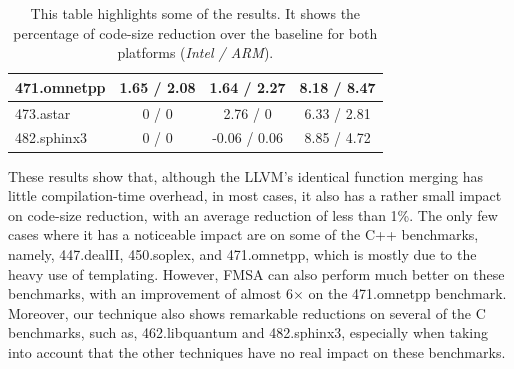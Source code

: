 \begin{table}[]
{\begin{tabular}{|l|c|c|c|}
471.omnetpp                               & 1.65 / 2.08        & 1.64 / 2.27   & 8.18 / 8.47             \\ \hline
473.astar                                 & 0 / 0              & 2.76 / 0      & 6.33 / 2.81             \\ \hline
482.sphinx3                               & 0 / 0              & -0.06 / 0.06  & 8.85 / 4.72             \\ \hline
\end{tabular}
}
\caption{This table highlights some of the results.
         It shows the percentage of code-size reduction over the baseline
         for both platforms (\textit{Intel / ARM}). }
\end{table}


These results show that, although the LLVM's identical function merging has 
little compilation-time overhead, in most cases, it also has a rather small
impact on code-size reduction, with an average reduction of less than 1\%.
The only few cases where it has a noticeable impact are on some of the C++
benchmarks, namely, 447.dealII, 450.soplex, and 471.omnetpp, which is mostly
due to the heavy use of templating. %
However, FMSA can also perform much better on these
benchmarks, with an improvement of almost 6$\times$ on the 471.omnetpp benchmark.
Moreover, our technique also shows remarkable reductions on several of the
C benchmarks, such as, 462.libquantum and 482.sphinx3, especially when taking into
account that the other techniques have no real impact on these benchmarks.


